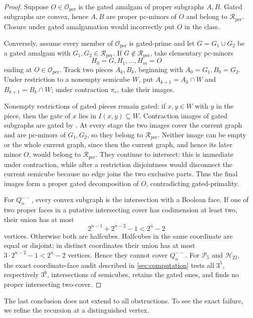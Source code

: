 \documentclass[11pt]{article}
\theoremstyle{definition}
\theoremstyle{remark}
\newcommand{\Rper}{\mathcal R_{\mathrm{per}}}
\newcommand{\Oper}{\mathcal O_{\mathrm{per}}}
\begin{document}
\begin{proof}
Suppose \(O\in\Oper\) is the gated amalgam of proper subgraphs \(A,B\).
Gated subgraphs are convex, hence \(A,B\) are proper pc-minors of \(O\) and
belong to \(\Rper\).  Closure under gated amalgamation would incorrectly put
\(O\) in the class.

Conversely, assume every member of \(\Oper\) is gated-prime and let
\(G=G_1\cup G_2\) be a gated amalgam with \(G_1,G_2\in\Rper\).  If
\(G\notin\Rper\), take elementary pc-minors
\[
 H_0=G,H_1,\ldots,H_m=O
\]
ending at \(O\in\Oper\).  Track two pieces \(A_k,B_k\), beginning with
\(A_0=G_1,B_0=G_2\).  Under restriction to a nonempty semicube \(W\), put
\(A_{k+1}=A_k\cap W\) and \(B_{k+1}=B_k\cap W\); under contraction
\(\pi_e\), take their images.

Nonempty restrictions of gated pieces remain gated: if \(x,y\in W\) with
\(y\) in the piece, then the gate of \(x\) lies in
\(I(x,y)\subseteq W\).  Contraction images of gated subgraphs are gated by
\cite[Lemma~10]{ChepoiKnauerMarc20}.  At every stage the two images cover
the current graph and are pc-minors of \(G_1,G_2\), so they belong to
\(\Rper\).  Neither image can be empty or the whole current graph, since
then the current graph, and hence its later minor \(O\), would belong to
\(\Rper\).  They continue to intersect: this is immediate under
contraction, while after a restriction disjointness would disconnect the
current semicube because no edge joins the two exclusive parts.  Thus the
final images form a proper gated decomposition of \(O\), contradicting
gated-primality.

For \(Q_n^{--}\), every convex subgraph is the intersection with a Boolean
face.  If one of two proper faces in a putative intersecting cover has
codimension at least two, their union has at most
\[
 2^{n-1}+2^{n-2}-1<2^n-2
\]
vertices.  Otherwise both are halfcubes.  Halfcubes in the same coordinate
are equal or disjoint; in distinct coordinates their union has at most
\(3\cdot2^{n-2}-1<2^n-2\) vertices.  Hence they cannot cover
\(Q_n^{--}\).  For \(\mathcal P_5\) and \(\mathcal H_{22}\), the exact
coordinate-face audit described in \cref{sec:computation} tests all
\(3^5\), respectively \(3^6\), intersections of semicubes, retains the
gated ones, and finds no proper intersecting two-cover.
\end{proof}

The last conclusion does not extend to all obstructions.  To see the exact
failure, we refine the recursion at a distinguished vertex.
\end{document}
